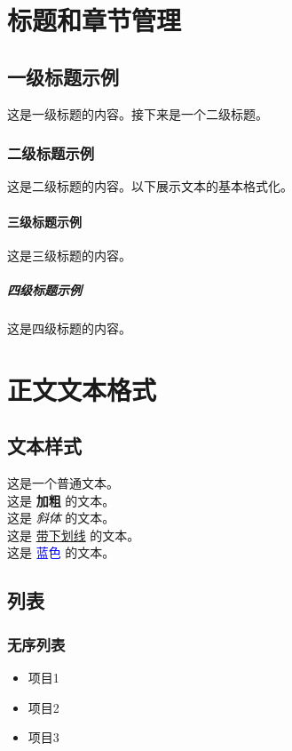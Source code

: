 \documentclass[a4paper,12pt]{report} %
\begin{document}
\tableofcontents
\newpage

\chapter{标题和章节管理}

\section{一级标题示例}
这是一级标题的内容。接下来是一个二级标题。

\subsection{二级标题示例}
这是二级标题的内容。以下展示文本的基本格式化。

\subsubsection{三级标题示例}
这是三级标题的内容。

\paragraph{四级标题示例}
这是四级标题的内容。

\chapter{正文文本格式}

\section{文本样式}
这是一个普通文本。\\
这是 \textbf{加粗} 的文本。\\
这是 \textit{斜体} 的文本。\\
这是 \underline{带下划线} 的文本。\\
这是 \textcolor{blue}{蓝色} 的文本。

\section{列表}

\subsection{无序列表}
\begin{itemize}
    \item 项目1
    \item 项目2
    \item 项目3
\end{itemize}
\end{document}
